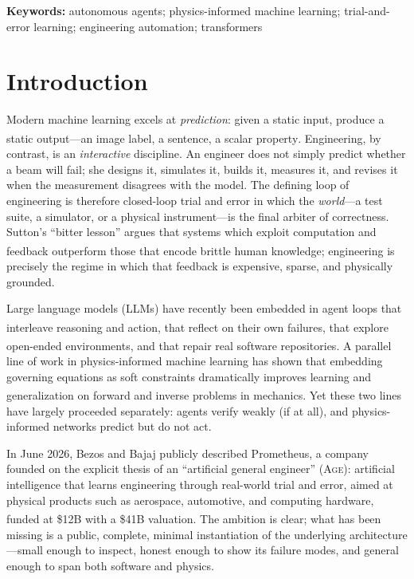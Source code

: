 \documentclass[11pt,a4paper]{article}
\newcommand{\Age}{\textsc{Age}}
\newcommand{\pn}{\textsuperscript}
\begin{document}
\noindent\textbf{Keywords:} autonomous agents; physics-informed machine learning;
trial-and-error learning; engineering automation; transformers

\section{Introduction}

Modern machine learning excels at \emph{prediction}: given a static input,
produce a static output---an image label, a sentence, a scalar
property\pn{\citep{lecun2015,brown2020,silver2017}}. Engineering, by
contrast, is an \emph{interactive} discipline. An engineer does not simply
predict whether a beam will fail; she designs it, simulates it, builds it,
measures it, and revises it when the measurement disagrees with the model.
The defining loop of engineering is therefore closed-loop trial and error in
which the \emph{world}---a test suite, a simulator, or a physical
instrument---is the final arbiter of correctness. Sutton's ``bitter lesson''
argues that systems which exploit computation and feedback outperform those
that encode brittle human knowledge\pn{\citep{sutton2019}}; engineering is
precisely the regime in which that feedback is expensive, sparse, and
physically grounded.

Large language models (LLMs) have recently been embedded in agent loops that
interleave reasoning and action\pn{\citep{yao2023,wei2022}}, that reflect on
their own failures\pn{\citep{shinn2023}}, that explore open-ended
environments\pn{\citep{wang2023,park2023}}, and that repair real software
repositories\pn{\citep{jimenez2024,li2022}}. A parallel line of work in
physics-informed machine learning has shown that embedding governing
equations as soft constraints dramatically improves learning and
generalization on forward and inverse problems in
mechanics\pn{\citep{raissi2019,karniadakis2021,lu2021,chen2018}}. Yet these
two lines have largely proceeded separately: agents verify weakly (if at
all), and physics-informed networks predict but do not act.

In June 2026, Bezos and Bajaj publicly described Prometheus, a company
founded on the explicit thesis of an ``artificial general engineer''
(\Age): artificial intelligence that learns engineering through real-world
trial and error, aimed at physical products such as aerospace, automotive,
and computing hardware, funded at \$12B with a \$41B
valuation\pn{\citep{techcrunch2026,wikipedia2025}}. The ambition is clear;
what has been missing is a public, complete, minimal instantiation of the
underlying architecture---small enough to inspect, honest enough to show its
failure modes, and general enough to span both software and physics.
\end{document}
